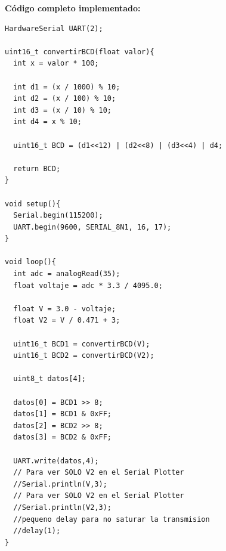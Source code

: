 \documentclass[letterpaper, 12pt]{article}
\begin{document}
\bigskip

\noindent\textbf{Código completo implementado:}

\begin{lstlisting}
HardwareSerial UART(2);

uint16_t convertirBCD(float valor){
  int x = valor * 100;

  int d1 = (x / 1000) % 10;
  int d2 = (x / 100) % 10;
  int d3 = (x / 10) % 10;
  int d4 = x % 10;

  uint16_t BCD = (d1<<12) | (d2<<8) | (d3<<4) | d4;

  return BCD;
}

void setup(){
  Serial.begin(115200);
  UART.begin(9600, SERIAL_8N1, 16, 17);
}

void loop(){
  int adc = analogRead(35);
  float voltaje = adc * 3.3 / 4095.0;

  float V = 3.0 - voltaje;
  float V2 = V / 0.471 + 3;

  uint16_t BCD1 = convertirBCD(V);
  uint16_t BCD2 = convertirBCD(V2);

  uint8_t datos[4];

  datos[0] = BCD1 >> 8;
  datos[1] = BCD1 & 0xFF;
  datos[2] = BCD2 >> 8;
  datos[3] = BCD2 & 0xFF;

  UART.write(datos,4);
  // Para ver SOLO V2 en el Serial Plotter 
  //Serial.println(V,3); 
  // Para ver SOLO V2 en el Serial Plotter  
  //Serial.println(V2,3); 
  //pequeno delay para no saturar la transmision 
  //delay(1);
}
\end{lstlisting}
\end{document}
